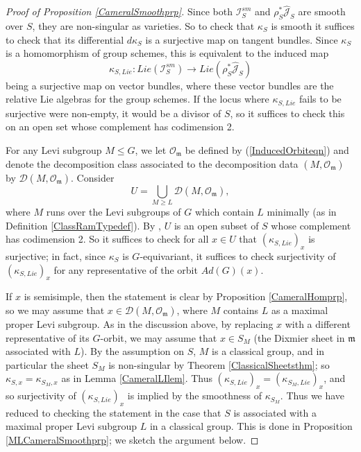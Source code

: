 \documentclass{amsart}
\theoremstyle{remark}
\numberwithin{theorem}{section}
\numberwithin{equation}{section}
\begin{document}
\begin{proof}[Proof of Proposition \ref{CameralSmoothprp}]
Since both $\mathcal I_S^{sm}$ and $\rho_S^* \hat{\mathcal J}_S$ are smooth over $S$, they are non-singular as varieties. So to check that $\kappa_S$ is smooth it suffices to check that its differential $d\kappa_S$ is a surjective map on tangent bundles. Since $\kappa_S$ is a homomorphism of group schemes, this is equivalent to the induced map
\begin{equation}\label{DiffCameralHomeqn}
    \kappa_{S,Lie}:Lie(\mathcal I_S^{sm}) \rightarrow Lie(\rho_S^* \hat{\mathcal J}_S)
\end{equation}
being a surjective map on vector bundles, where these vector bundles are the relative Lie algebras for the group schemes. If the locus where $\kappa_{S,Lie}$ fails to be surjective were non-empty, it would be a divisor of $S$, so it suffices to check this on an open set whose complement has codimension 2.

For any Levi subgroup $M \leq G$, we let $\mathcal O_{\mathfrak{m}}$ be defined by (\ref{InducedOrbiteqn}) and denote the decomposition class associated to the decomposition data $(M,\mathcal O_{\mathfrak{m}})$ by $\mathcal D(M,\mathcal O_{\mathfrak{m}})$. Consider
\begin{equation}\label{CameralSmooth1eqn}
    U = \bigcup_{M \geq L} \mathcal D(M,\mathcal O_{\mathfrak{m}}), 
\end{equation}
where $M$ runs over the Levi subgroups of $G$ which contain $L$ minimally (as in Definition \ref{ClassRamTypedef}). By \cite[Korollar 3.6]{Borho2}, $U$ is an open subset of $S$ whose complement has codimension 2. So it suffices to check for all $x \in U$ that $(\kappa_{S,Lie})_x$ is surjective; in fact, since $\kappa_S$ is $G$-equivariant, it suffices to check surjectivity of $(\kappa_{S, Lie})_x$ for any representative of the orbit $Ad(G)(x)$. 

If $x$ is semisimple, then the statement is clear by Proposition \ref{CameralHomprp}, so we may assume that $x \in \mathcal D(M, \mathcal O_{\mathfrak{m}})$, where $M$ contains $L$ as a maximal proper Levi subgroup.  As in the discussion above, by replacing $x$ with a different representative of its $G$-orbit, we may assume that $x \in S_M$ (the Dixmier sheet in $\mathfrak{m}$ associated with $L$). By the assumption on $S$, $M$ is a classical group, and in particular the sheet $S_M$ is non-singular by Theorem \ref{ClassicalSheetsthm}; so $\kappa_{S,x} = \kappa_{S_M,x}$ as in Lemma \ref{CameralLIlem}. Thus $(\kappa_{S,Lie})_x = (\kappa_{S_M,Lie})_x$, and so surjectivity of $(\kappa_{S,Lie})_x$ is implied by the smoothness of $\kappa_{S_M}$.  Thus we have reduced to checking the statement in the case that $S$ is associated with a maximal proper Levi subgroup $L$ in a classical group. This is done in Proposition \ref{MLCameralSmoothprp}; we sketch the argument below.


\end{proof}
\end{document}
